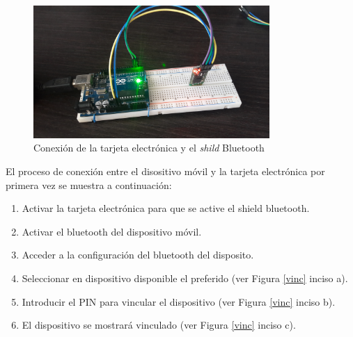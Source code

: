 %
\begin{figure}[H]
\centering
\includegraphics[width=0.8\textwidth]{metodologia/conexion_bluetooth.jpg}
\caption{Conexión de la tarjeta electrónica y el \textit{shild} Bluetooth}
\label{conexion}
\end{figure}


El proceso de conexión entre el disositivo móvil y la tarjeta electrónica por primera vez se muestra a continuación:

\begin{enumerate}
\item Activar la tarjeta electrónica para que se active el shield bluetooth.
\item Activar el bluetooth del dispositivo móvil.
\item Acceder a la configuración del bluetooth del disposito.
\item Seleccionar en dispositivo disponible el preferido (ver Figura \ref{vinc} inciso a).
\item Introducir el PIN para vincular el dispositivo (ver Figura \ref{vinc} inciso b).
\item El dispositivo se mostrará vinculado (ver Figura \ref{vinc} inciso c).
\end{enumerate}

